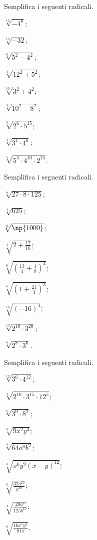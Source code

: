 \begin{esercizio}[\Ast]
 \label{ese:2.26}
Semplifica i seguenti radicali.
 \begin{multicols}{3}
 \begin{enumeratea}
 \item $\sqrt[12]{-4^6}$;
 \item $\sqrt[10]{-32}$;
 \item $\sqrt[6]{5^2-4^2}$;
 \item $\sqrt[4]{12^2+5^2}$;
 \item $\sqrt[10]{3^2+4^2}$;
 \item $\sqrt[4]{10^2-8^2}$;
 \item $\sqrt[3]{2^6\cdot 5^{15}}$;
 \item $\sqrt[4]{3^4\cdot 4^6}$;
 \item $\sqrt[5]{5^5\cdot 4^{10}\cdot 2^{15}}$.
 \end{enumeratea}
 \end{multicols}
\end{esercizio}

\begin{esercizio}[\Ast]
 \label{ese:2.27}
Semplifica i seguenti radicali.
 \begin{multicols}{3}
 \begin{enumeratea}
 \item $\sqrt[9]{27\cdot 8\cdot 125}$;
 \item $\sqrt[4]{625}$;
 \item $\sqrt[6]{\np{1000}}$;
 \item $\sqrt[4]{2+\frac{17}{16}}$;
 \item $\sqrt[6]{\left(\frac{13} 4+\frac 1 8\right)^4}$;
 \item $\sqrt[6]{\left(1+\frac{21} 4\right)^3}$;
 \item $\sqrt[16]{(-16)^4}$;
 \item $\sqrt[10]{2^{10}\cdot 3^{20}}$;
 \item $\sqrt[6]{2^8\cdot 3^6}$.
 \end{enumeratea}
 \end{multicols}
\end{esercizio}

\begin{esercizio}[\Ast]
 \label{ese:2.28}
Semplifica i seguenti radicali.
 \begin{multicols}{3}
 \begin{enumeratea}
 \item $\sqrt[12]{3^6\cdot 4^{12}}$;
 \item $\sqrt[4]{2^{10}\cdot 3^{15}\cdot 12^5}$;
 \item $\sqrt[6]{3^9\cdot 8^2}$;
 \item $\sqrt[4]{9x^2y^4}$;
 \item $\sqrt[3]{64a^6b^9}$;
 \item $\sqrt[3]{x^6y^9(x-y)^{12}}$;
 \item $\sqrt[5]{\frac{32a^{10}}{b^{20}}}$;
 \item $\sqrt[4]{\frac{20a^6}{125b^{10}}}$;
 \item $\sqrt[8]{\frac{16x^5y^8}{81x}}$.
 \end{enumeratea}
 \end{multicols}
\end{esercizio}

